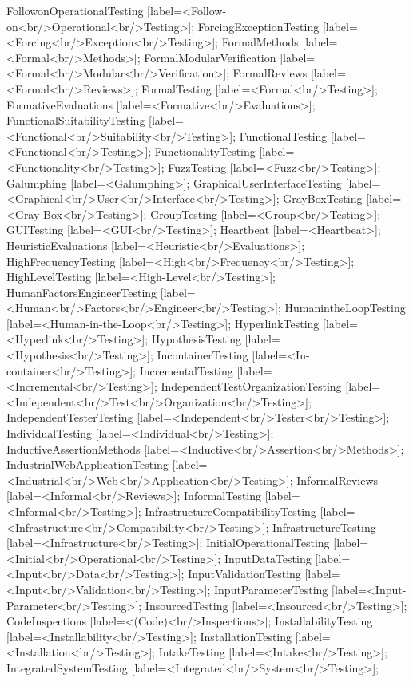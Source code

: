 \documentclass{article}
\begin{document}
{FollowonOperationalTesting [label=<Follow-on<br/>Operational<br/>Testing>];
ForcingExceptionTesting [label=<Forcing<br/>Exception<br/>Testing>];
FormalMethods [label=<Formal<br/>Methods>];
FormalModularVerification [label=<Formal<br/>Modular<br/>Verification>];
FormalReviews [label=<Formal<br/>Reviews>];
FormalTesting [label=<Formal<br/>Testing>];
FormativeEvaluations [label=<Formative<br/>Evaluations>];
FunctionalSuitabilityTesting [label=<Functional<br/>Suitability<br/>Testing>];
FunctionalTesting [label=<Functional<br/>Testing>];
FunctionalityTesting [label=<Functionality<br/>Testing>];
FuzzTesting [label=<Fuzz<br/>Testing>];
Galumphing [label=<Galumphing>];
GraphicalUserInterfaceTesting [label=<Graphical<br/>User<br/>Interface<br/>Testing>];
GrayBoxTesting [label=<Gray-Box<br/>Testing>];
GroupTesting [label=<Group<br/>Testing>];
GUITesting [label=<GUI<br/>Testing>];
Heartbeat [label=<Heartbeat>];
HeuristicEvaluations [label=<Heuristic<br/>Evaluations>];
HighFrequencyTesting [label=<High<br/>Frequency<br/>Testing>];
HighLevelTesting [label=<High-Level<br/>Testing>];
HumanFactorsEngineerTesting [label=<Human<br/>Factors<br/>Engineer<br/>Testing>];
HumanintheLoopTesting [label=<Human-in-the-Loop<br/>Testing>];
HyperlinkTesting [label=<Hyperlink<br/>Testing>];
HypothesisTesting [label=<Hypothesis<br/>Testing>];
IncontainerTesting [label=<In-container<br/>Testing>];
IncrementalTesting [label=<Incremental<br/>Testing>];
IndependentTestOrganizationTesting [label=<Independent<br/>Test<br/>Organization<br/>Testing>];
IndependentTesterTesting [label=<Independent<br/>Tester<br/>Testing>];
IndividualTesting [label=<Individual<br/>Testing>];
InductiveAssertionMethods [label=<Inductive<br/>Assertion<br/>Methods>];
IndustrialWebApplicationTesting [label=<Industrial<br/>Web<br/>Application<br/>Testing>];
InformalReviews [label=<Informal<br/>Reviews>];
InformalTesting [label=<Informal<br/>Testing>];
InfrastructureCompatibilityTesting [label=<Infrastructure<br/>Compatibility<br/>Testing>];
InfrastructureTesting [label=<Infrastructure<br/>Testing>];
InitialOperationalTesting [label=<Initial<br/>Operational<br/>Testing>];
InputDataTesting [label=<Input<br/>Data<br/>Testing>];
InputValidationTesting [label=<Input<br/>Validation<br/>Testing>];
InputParameterTesting [label=<Input-Parameter<br/>Testing>];
InsourcedTesting [label=<Insourced<br/>Testing>];
CodeInspections [label=<(Code)<br/>Inspections>];
InstallabilityTesting [label=<Installability<br/>Testing>];
InstallationTesting [label=<Installation<br/>Testing>];
IntakeTesting [label=<Intake<br/>Testing>];
IntegratedSystemTesting [label=<Integrated<br/>System<br/>Testing>];
}
\end{document}

